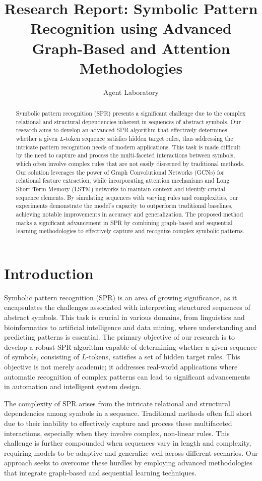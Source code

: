 \documentclass{article}
\title{Research Report: Symbolic Pattern Recognition using Advanced Graph-Based and Attention Methodologies}
\author{Agent Laboratory}
\begin{document}
\maketitle

\begin{abstract}
Symbolic pattern recognition (SPR) presents a significant challenge due to the complex relational and structural dependencies inherent in sequences of abstract symbols. Our research aims to develop an advanced SPR algorithm that effectively determines whether a given $L$-token sequence satisfies hidden target rules, thus addressing the intricate pattern recognition needs of modern applications. This task is made difficult by the need to capture and process the multi-faceted interactions between symbols, which often involve complex rules that are not easily discerned by traditional methods. Our solution leverages the power of Graph Convolutional Networks (GCNs) for relational feature extraction, while incorporating attention mechanisms and Long Short-Term Memory (LSTM) networks to maintain context and identify crucial sequence elements. By simulating sequences with varying rules and complexities, our experiments demonstrate the model's capacity to outperform traditional baselines, achieving notable improvements in accuracy and generalization. The proposed method marks a significant advancement in SPR by combining graph-based and sequential learning methodologies to effectively capture and recognize complex symbolic patterns.
\end{abstract}

\section{Introduction}
Symbolic pattern recognition (SPR) is an area of growing significance, as it encapsulates the challenges associated with interpreting structured sequences of abstract symbols. This task is crucial in various domains, from linguistics and bioinformatics to artificial intelligence and data mining, where understanding and predicting patterns is essential. The primary objective of our research is to develop a robust SPR algorithm capable of determining whether a given sequence of symbols, consisting of $L$-tokens, satisfies a set of hidden target rules. This objective is not merely academic; it addresses real-world applications where automatic recognition of complex patterns can lead to significant advancements in automation and intelligent system design.

The complexity of SPR arises from the intricate relational and structural dependencies among symbols in a sequence. Traditional methods often fall short due to their inability to effectively capture and process these multifaceted interactions, especially when they involve complex, non-linear rules. This challenge is further compounded when sequences vary in length and complexity, requiring models to be adaptive and generalize well across different scenarios. Our approach seeks to overcome these hurdles by employing advanced methodologies that integrate graph-based and sequential learning techniques.
\end{document}
